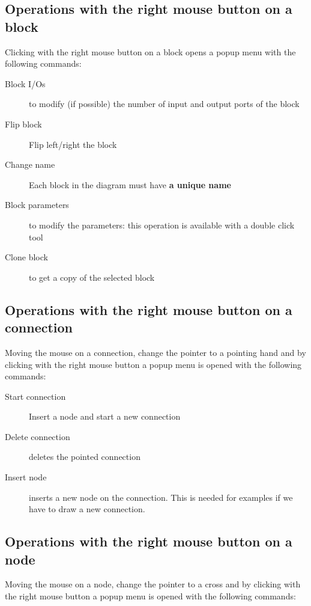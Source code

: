 \subsection{Operations with the right mouse button on a block}

Clicking with the right mouse button on a block opens a popup menu with the 
following commands:

\begin{description}
\item [Block I/Os] to modify (if possible) the number of input and output ports 
of the block
\item [Flip block] Flip left/right the block
\item [Change name] Each block in the diagram must have \textbf{a unique name}
\item [Block parameters] to modify the parameters: this operation is available 
with a double click tool
\item [Clone block] to get a copy of the selected block
\end{description}

\subsection{Operations with the right mouse button on a connection}

Moving the mouse on a connection, change the pointer to a pointing hand and by 
clicking with the right mouse button a popup menu is opened with the following 
commands:

\begin{description}
\item[Start connection] Insert a node and start a new connection
\item[Delete connection] deletes the pointed connection
\item [Insert node] inserts a new node on the connection. This is needed for 
examples if we have to draw a new connection.
\end{description}

\subsection{Operations with the right mouse button on a node}

Moving the mouse on a node, change the pointer to a cross and by 
clicking with the right mouse button a popup menu is opened with the following 
commands:

